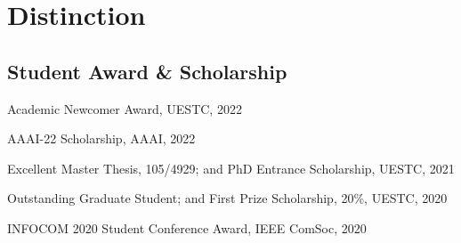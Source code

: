 \section*{Distinction}


\subsection*{\hspace{1.6em}Student Award \& Scholarship}
\indent

Academic Newcomer Award, UESTC, 2022

AAAI-22 Scholarship, AAAI, 2022

Excellent Master Thesis, 105/4929; and PhD Entrance Scholarship, UESTC, 2021

Outstanding Graduate Student; and First Prize Scholarship, 20\%, UESTC, 2020


INFOCOM 2020 Student Conference Award, IEEE ComSoc, 2020

